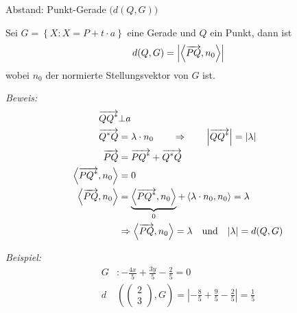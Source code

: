 \begin{mylemma}
    Abstand: Punkt-Gerade $\big( d(Q,G) \big)$\\

    \begin{minipage}{0.6\textwidth}
        Sei $G = \left\{ X : X = P+t \cdot a \right\}$ eine Gerade und $Q$ ein Punkt, dann ist
        \begin{align*}
            d(Q,G) = \left| \left\langle \overrightarrow{PQ} , n_0 \right\rangle \right|
        \end{align*}
        wobei $n_0$ der normierte Stellungsvektor von $G$ ist.
    \end{minipage}
    \begin{minipage}{0.4\textwidth}
        \begin{center}
        \end{center}
    \end{minipage}

    \textit{Beweis:}
    \begin{align*}
        \overrightarrow{QQ^*} & \bot a\\
        \overrightarrow{Q^*Q} & = \lambda \cdot n_0 \qquad \Rightarrow \qquad \left| \overrightarrow{QQ^*} \right| = \left| \lambda \right|\\
        \overrightarrow{PQ} & = \overrightarrow{PQ^*}  + \overrightarrow{Q^*Q}\\
        \left\langle \overrightarrow{PQ^*} , n_0 \right\rangle & = 0\\
        \left\langle \overrightarrow{PQ} , n_0 \right\rangle & = \underbrace{\left\langle \overrightarrow{PQ^*} , n_0 \right\rangle}_{0} + \left\langle \lambda \cdot n_0, n_0 \right\rangle = \lambda\\
        & \Rightarrow \left\langle \overrightarrow{PQ} , n_0 \right\rangle = \lambda \quad \text{und} \quad |\lambda| = d(Q,G)
    \end{align*}
\end{mylemma}
\textit{Beispiel:}
\begin{align*}
    G & : -\frac{4x}{5} + \frac{3y}{5} - \frac{2}{5} = 0\\
    d & \left(
    \begin{pmatrix}
        2\\3
    \end{pmatrix}
    ,G
    \right)
    =
    \left| -\frac{8}{5} + \frac{9}{5} - \frac{2}{5}  \right| = \frac{1}{5}
\end{align*}

\begin{mylemma}

\end{mylemma}

